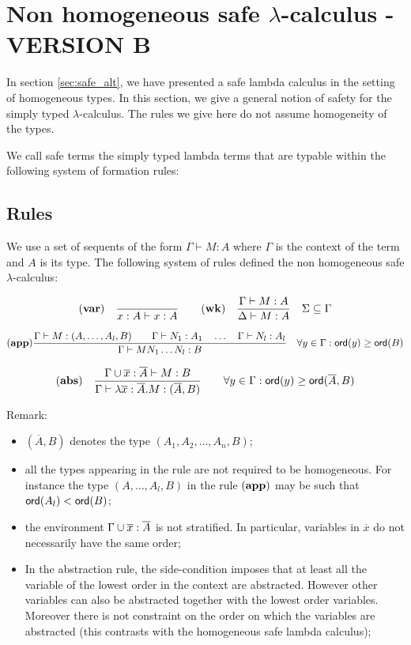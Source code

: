 \clearpage

\section{Non homogeneous safe $\lambda$-calculus - VERSION B}

In section \ref{sec:safe_alt}, we have presented a safe lambda
calculus in the setting of homogeneous types. In this section, we
give a general notion of safety for the simply typed
$\lambda$-calculus. The rules we give here do not assume homogeneity
of the types.

We call safe terms the simply typed lambda terms that are
typable within the following system of formation rules:

\subsection{Rules}

We use a set of sequents of the form $\Gamma \vdash M : A$ where $\Gamma$ is the context of the term and $A$ is its type.
The following system of rules defined the non homogeneous safe $\lambda$-calculus:

$$ \mathbf{(var)} \quad  \frac{\displaystyle }{x : A\vdash x : A}
\qquad  \mathbf{(wk)} \quad  \frac{\displaystyle \Gamma \vdash M : A}{\Delta \vdash M : A} \quad \Sigma \subseteq \Gamma$$

$$ \mathbf{(app)} \frac{\displaystyle \Gamma \vdash M : (A,\ldots,A_l,B)
                                        \qquad \Gamma \vdash N_1 : A_1
                                        \quad \ldots \quad \Gamma \vdash N_l : A_l  }{\Gamma  \vdash M N_1 \ldots N_l : B}
                                    \quad
                                   \forall y \in \Gamma : {\sf ord}(y) \geq {\sf ord}(B)$$

$$ \mathbf{(abs)} \quad  \frac{\displaystyle \Gamma \cup \overline{x} : \overline{A} \vdash M : B}{\Gamma  \vdash \lambda \overline{x} : \overline{A} . M : (\overline{A},B)} \qquad
                                   \forall y \in \Gamma : {\sf ord}(y) \geq {\sf ord}(\overline{A},B)$$


Remark:
\begin{itemize}
\item $(\overline{A},B)$ denotes the type $(A_1,A_2, \ldots, A_n, B)$;
\item all the types appearing in the rule are not required to be homogeneous. For instance
the type $(A,\ldots,A_l,B)$ in the rule $\mathbf{(app)}$ may be such that ${\sf ord}(A_l) < {\sf ord}(B)$;
\item the environment $\Gamma \cup \overline{x}:\overline{A}$ is not stratified. In particular, variables in $\overline{x}$ do not necessarily have the same order;
\item In the abstraction rule, the side-condition imposes that at least all the variable of the lowest order
in the context are abstracted. However other variables can also be
abstracted together with the lowest order variables. Moreover there
is not constraint on the order on which the variables are abstracted
(this contrasts with the homogeneous safe lambda calculus);
\end{itemize}

